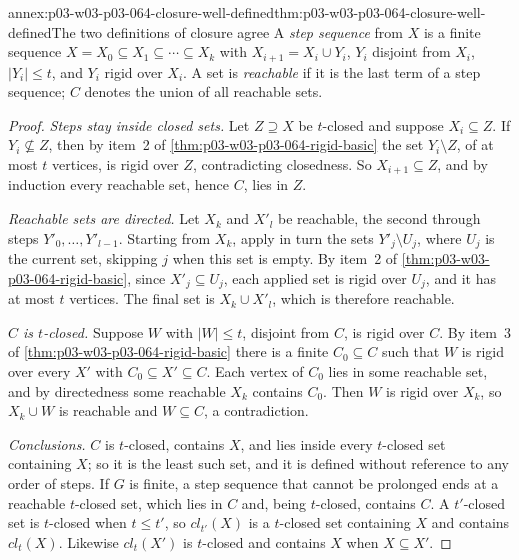 \begin{annexitem}{annex:p03-w03-p03-064-closure-well-defined}{thm:p03-w03-p03-064-closure-well-defined}{The two definitions of closure agree}
A \emph{step sequence} from \(X\) is a finite sequence
\(X=X_0\subseteq X_1\subseteq\cdots\subseteq X_k\) with
\(X_{i+1}=X_i\cup Y_i\), \(Y_i\) disjoint from \(X_i\), \(|Y_i|\leq t\), and
\(Y_i\) rigid over \(X_i\).  A set is \emph{reachable} if it is the last term
of a step sequence; \(C\) denotes the union of all reachable sets.
\begin{proof}
\emph{Steps stay inside closed sets.}  Let \(Z\supseteq X\) be \(t\)-closed
and suppose \(X_i\subseteq Z\).  If \(Y_i\not\subseteq Z\), then by item~2 of
\cref{thm:p03-w03-p03-064-rigid-basic} the set \(Y_i\setminus Z\), of at most
\(t\) vertices, is rigid over \(Z\), contradicting closedness.  So
\(X_{i+1}\subseteq Z\), and by induction every reachable set, hence \(C\),
lies in \(Z\).

\emph{Reachable sets are directed.}  Let \(X_k\) and \(X'_l\) be reachable,
the second through steps \(Y'_0,\ldots,Y'_{l-1}\).  Starting from \(X_k\),
apply in turn the sets \(Y'_j\setminus U_j\), where \(U_j\) is the current
set, skipping \(j\) when this set is empty.  By item~2 of
\cref{thm:p03-w03-p03-064-rigid-basic}, since \(X'_j\subseteq U_j\), each
applied set is rigid over \(U_j\), and it has at most \(t\) vertices.  The
final set is \(X_k\cup X'_l\), which is therefore reachable.

\emph{\(C\) is \(t\)-closed.}  Suppose \(W\) with \(|W|\leq t\), disjoint from
\(C\), is rigid over \(C\).  By item~3 of
\cref{thm:p03-w03-p03-064-rigid-basic} there is a finite \(C_0\subseteq C\)
such that \(W\) is rigid over every \(X'\) with \(C_0\subseteq X'\subseteq C\).
Each vertex of \(C_0\) lies in some reachable set, and by directedness some
reachable \(X_k\) contains \(C_0\).  Then \(W\) is rigid over \(X_k\), so
\(X_k\cup W\) is reachable and \(W\subseteq C\), a contradiction.

\emph{Conclusions.}  \(C\) is \(t\)-closed, contains \(X\), and lies inside
every \(t\)-closed set containing \(X\); so it is the least such set, and it
is defined without reference to any order of steps.  If \(G\) is finite, a
step sequence that cannot be prolonged ends at a reachable \(t\)-closed set,
which lies in \(C\) and, being \(t\)-closed, contains \(C\).  A
\(t'\)-closed set is \(t\)-closed when \(t\leq t'\), so \(cl_{t'}(X)\) is a
\(t\)-closed set containing \(X\) and contains \(cl_t(X)\).  Likewise
\(cl_t(X')\) is \(t\)-closed and contains \(X\) when \(X\subseteq X'\).
\end{proof}
\end{annexitem}

